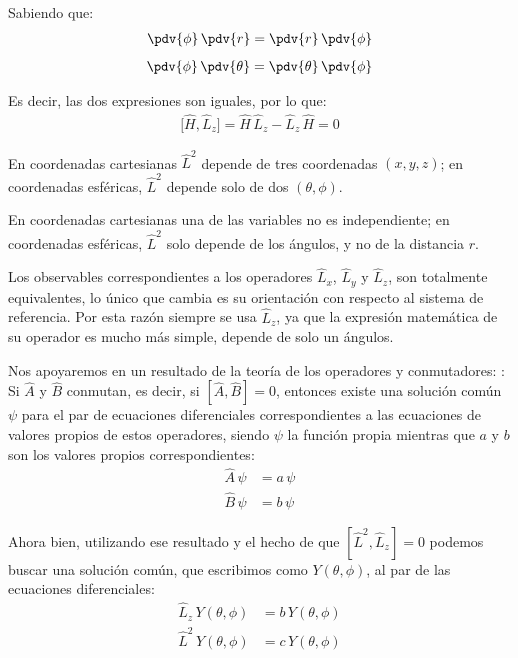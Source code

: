 Sabiendo que:
\begin{align*}
\pdv{\phi} \, \pdv{r} = \pdv{r} \, \pdv{\phi} \\[0.5em]
\pdv{\phi} \, \pdv{\theta} = \pdv{\theta} \, \pdv{\phi}
\end{align*}

Es decir, las dos expresiones son iguales, por lo que:
\begin{align*}
\big[ \hat{H}, \hat{L}_{z} \big] = \hat{H} \, \hat{L}_{z} - \hat{L}_{z} \, \hat{H} = 0
\end{align*}

En coordenadas cartesianas $\hat{L}^{2}$ depende de tres coordenadas $(x, y, z)$; en coordenadas esféricas, $\hat{L}^{2}$ depende solo de dos $(\theta, \phi)$.
\par
En coordenadas cartesianas una de las variables no es independiente; en coordenadas esféricas, $\hat{L}^{2}$ solo depende de los ángulos, y no de la distancia $r$.
\par
Los observables correspondientes a los operadores $\hat{L}_{x}$, $\hat{L}_{y}$ y $\hat{L}_{z}$, son totalmente equivalentes, lo único que cambia es su orientación con respecto al sistema de referencia. Por esta razón siempre se usa $\hat{L}_{z}$, ya que la expresión matemática de su operador es mucho más simple, depende de solo un ángulos.
\par
Nos apoyaremos en un resultado de la teoría de los operadores y conmutadores: : Si $\hat{A}$ y $\hat{B}$ conmutan, es decir, si  $[\hat{A}, \hat{B}] = 0$, entonces existe una solución común $\psi$  para el par de ecuaciones diferenciales correspondientes a las ecuaciones de valores propios de estos operadores, siendo $\psi$ la función propia mientras que $a$ y $b$ son los valores propios correspondientes:
\begin{align*}
\hat{A} \, \psi &= a \, \psi \\[0.5em]
\hat{B} \, \psi &= b \, \psi
\end{align*}

Ahora bien, utilizando ese resultado y el hecho de que $[\hat{L}^{2}, \hat{L}_{z}] = 0$ podemos buscar una solución común, que escribimos como $Y(\theta, \phi)$, al par de las ecuaciones diferenciales:
\begin{align*}
\hat{L}_{z} \, Y(\theta, \phi) &= b \, Y(\theta, \phi) \\[0.5em]
\hat{L}^{2} \, Y(\theta, \phi) &= c \, Y(\theta, \phi)
\end{align*}

